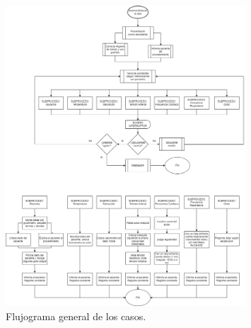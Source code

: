 \begin{figure}[H]
    \centering
	\includegraphics[width=0.8\textwidth]{./imagenes/ACV-AdSC-ResolucionGeneralCasosIIEnf.png}
	\caption{\label{fig:PlanXVII:FlujogramaGeneral}Flujograma general de los casos.}
\end{figure}
\clearpage
